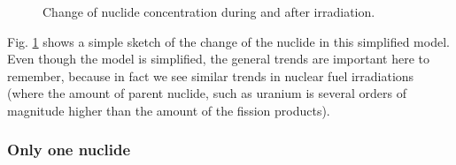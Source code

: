 \begin{figure}[ht!]
\protect {}\protect
\caption{\label{fig:irradiationconc} \footnotesize{Change of nuclide concentration during and after irradiation.}}
\end{figure}

Fig. \ref{fig:irradiationconc} shows a simple sketch of the change of the nuclide in this simplified model. Even though the model is simplified, the general trends are important here to remember, because in fact we see similar trends in nuclear fuel irradiations (where the amount of parent nuclide, such as uranium is several orders of magnitude higher than the amount of the fission products).

\subsubsection*{Only one nuclide}

